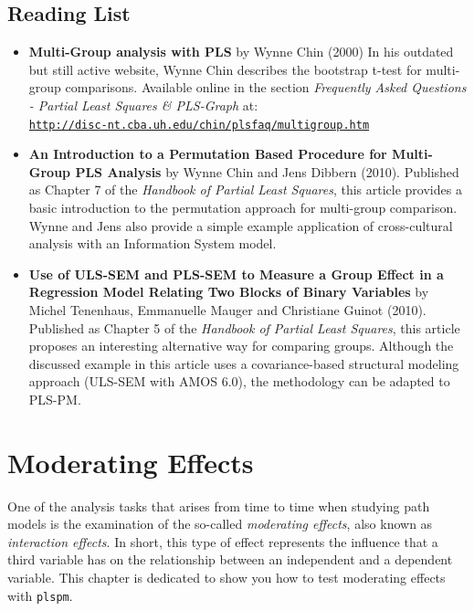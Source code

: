 \documentclass[12pt]{book}\usepackage{graphicx, color}
\newcommand{\plspm}{\texttt{plspm}}
\begin{document}
\section{Reading List}
\begin{itemize}
 \vspace{2mm}
 \item \textbf{\textsf{Multi-Group analysis with PLS}} by Wynne Chin (2000) In his outdated but still active website, Wynne Chin describes the bootstrap t-test for multi-group comparisons. Available online in the section \textit{Frequently Asked Questions - Partial Least Squares \& PLS-Graph} at: \\ 
 \texttt{\href{http://disc-nt.cba.uh.edu/chin/plsfaq/multigroup.htm}{http://disc-nt.cba.uh.edu/chin/plsfaq/multigroup.htm}}

 \vspace{2mm}
 \item \textbf{\textsf{An Introduction to a Permutation Based Procedure for Multi-Group PLS Analysis}} by Wynne Chin and Jens Dibbern (2010). Published as Chapter 7 of the \textit{Handbook of Partial Least Squares}, this article provides a basic introduction to the permutation approach for multi-group comparison. Wynne and Jens also provide a simple example application of cross-cultural analysis with an Information System model. 
 
 \vspace{2mm}
 \item \textbf{\textsf{Use of ULS-SEM and PLS-SEM to Measure a Group Effect in a Regression Model Relating Two Blocks of Binary Variables}} by Michel Tenenhaus, Emmanuelle Mauger and Christiane Guinot (2010). Published as Chapter 5 of the \textit{Handbook of Partial Least Squares}, this article proposes an interesting alternative way for comparing groups. Although the discussed example in this article uses a covariance-based structural modeling approach (ULS-SEM with AMOS 6.0), the methodology can be adapted to PLS-PM. 
 
\end{itemize}





\chapter{Moderating Effects}
One of the analysis tasks that arises from time to time when studying path models is the examination of the so-called \textit{moderating effects}, also known as \textit{interaction effects}. In short, this type of effect represents the influence that a third variable has on the relationship between an independent and a dependent variable. This chapter is dedicated to show you how to test moderating effects with \plspm{}. 
\end{document}
